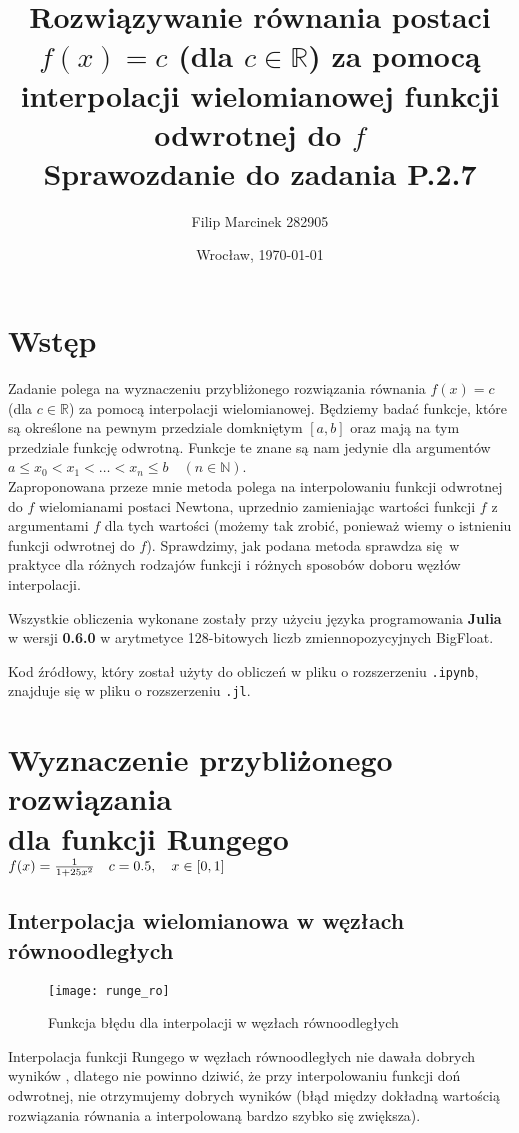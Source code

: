 \documentclass{article}
\date{Wrocław, \today}
\title{\textbf{Rozwiązywanie równania postaci $f(x) = c$ (dla $c \in \mathbb{R}$) za pomocą interpolacji wielomianowej funkcji odwrotnej do $f$}
		    \\ \vspace{3mm} Sprawozdanie do zadania P.2.7}
\author{Filip Marcinek 282905}
\begin{document}
\maketitle

\section{Wstęp} 
\indent\hspace{5mm} Zadanie polega na wyznaczeniu przybliżonego rozwiązania równania $f(x) = c$ (dla $c \in \mathbb{R}$) za pomocą interpolacji wielomianowej.
Będziemy badać funkcje, które są określone na pewnym przedziale domkniętym $ [a,b] $ oraz mają na tym przedziale funkcję odwrotną. Funkcje te znane są nam jedynie dla argumentów
$ a \leqslant x_0 < x_1 < \dots < x_n \leqslant b \quad (n \in \mathbb{N}) $. \\
\indent Zaproponowana przeze mnie metoda polega na interpolowaniu funkcji odwrotnej do $f$ wielomianami postaci Newtona, 
uprzednio zamieniając wartości funkcji $f$ z argumentami $f$ dla tych wartości (możemy tak zrobić, ponieważ wiemy o istnieniu funkcji odwrotnej do $f$).
Sprawdzimy, jak podana metoda sprawdza się w praktyce dla różnych rodzajów funkcji i różnych sposobów doboru węzłów interpolacji.

\indent Wszystkie obliczenia wykonane zostały przy użyciu języka programowania \textbf{Julia} w wersji \textbf{0.6.0} w arytmetyce 128-bitowych liczb zmiennopozycyjnych BigFloat.

\indent Kod źródłowy, który został użyty do obliczeń w pliku o rozszerzeniu \verb+.ipynb+, znajduje się w pliku o rozszerzeniu \verb+.jl+.

\clearpage

\section{Wyznaczenie przybliżonego rozwiązania \\ dla funkcji Rungego $ f(x) = \frac{1}{1+25x^2} \\ \quad c = 0.5, \quad x \in [0,1] $}
\subsection{Interpolacja wielomianowa w węzłach równoodległych}
\begin{figure}[ht]
	\begin{center}
		\texttt{[image: runge\_ro]}
	\end{center}
	\caption{Funkcja błędu dla interpolacji w węzłach równoodległych}
	\label{fig:5}
\end{figure}
\indent Interpolacja funkcji Rungego w węzłach równoodległych nie dawała dobrych wyników \cite{runge}, dlatego nie powinno dziwić, że przy interpolowaniu funkcji doń odwrotnej, nie otrzymujemy dobrych wyników
(błąd między dokładną wartością rozwiązania równania a interpolowaną bardzo szybko się zwiększa).
\end{document}
